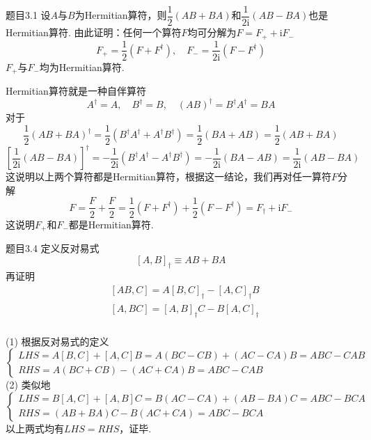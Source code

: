 \begin{question}{题目3.1}
    设$A$与$B$为Hermitian算符，则$\dfrac{1}{2}(AB+BA)$和$\dfrac{1}{2\mathrm{i}}(AB-BA)$也是Hermitian算符. 由此证明：任何一个算符$F$均可分解为$F=F_{+}+\mathrm{i}F_{-}$
    $$
        F_{+}=\frac{1}{2}(F+F^{\dagger}),\quad
        F_{-}=\frac{1}{2\mathrm{i}}(F-F^{\dagger})
    $$
    $F_{+}$与$F_{-}$均为Hermitian算符.
\end{question}
\begin{solution}
    Hermitian算符就是一种自伴算符
    $$
        A^\dagger = A, \quad B^\dagger = B, \quad (AB)^{\dagger}=B^{\dagger}A^{\dagger}=BA
    $$
    对于
    $$
        \frac{1}{2}(AB+BA)^\dagger
        = \frac{1}{2}\left(B^\dagger A^\dagger + A^\dagger B^\dagger\right)
        = \frac{1}{2}(BA+AB)
        = \frac{1}{2}(AB+BA)
    $$
    $$
        \left[\frac{1}{2\mathrm{i}}(AB-BA)\right]^\dagger
        = -\frac{1}{2\mathrm{i}}\left(B^{\dagger}A^{\dagger} - A^{\dagger}B^{\dagger}\right)
        = -\frac{1}{2\mathrm{i}}\left(BA-AB\right)
        = \frac{1}{2\mathrm{i}}\left(AB-BA\right)
    $$
    这说明以上两个算符都是Hermitian算符，根据这一结论，我们再对任一算符$F$分解
    $$
        F = \frac{F}{2}+\frac{F}{2}
        = \frac{1}{2}\left(F+F^\dagger\right)+\frac{1}{2}\left(F-F^\dagger\right)
        = F_{\dagger}+\mathrm{i}F_{-}
    $$
    这说明$F_{+}$和$F_{-}$都是Hermitian算符.
\end{solution}



\begin{question}{题目3.4}
    定义反对易式
    $$
        [A, B]_{\dagger} \equiv AB+BA
    $$
    再证明
    $$
        \begin{aligned}
             & [AB, C] = A[B, C]_{\dagger} - [A, C]_{\dagger}B \\
             & [A, BC] = [A, B]_{\dagger}C - B[A, C]_{\dagger} \\
        \end{aligned}
    $$
\end{question}
\begin{solution}
    (1) 根据反对易式的定义
    $$
        \begin{cases}
            LHS=A[B,C]+[A,C]B=A(BC-CB)+(AC-CA)B=ABC-CAB \\
            RHS=A(BC+CB)-(AC+CA)B=ABC-CAB
        \end{cases}
    $$
    (2) 类似地
    $$
        \begin{cases}
            LHS=B[A,C]+[A,B]C=B(AC-CA)+(AB-BA)C=ABC-BCA \\
            RHS=(AB+BA)C-B(AC+CA)=ABC-BCA
        \end{cases}
    $$
    以上两式均有$LHS=RHS$，证毕.
\end{solution}

